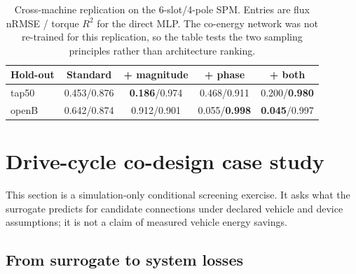 \documentclass[review]{elsarticle}
\begin{document}
\begin{table}[t]
\centering\small
\caption{Cross-machine replication on the 6-slot/4-pole SPM. Entries are
flux nRMSE / torque $R^2$ for the direct MLP. The co-energy network was not
re-trained for this replication, so the table tests the two sampling
principles rather than architecture ranking.}
\label{tab:machine2}
\begin{tabular}{lcccc}
\toprule
Hold-out & Standard & + magnitude & + phase & + both \\
\midrule
tap50 & 0.453/0.876 & \textbf{0.186}/0.974 & 0.468/0.911 & 0.200/\textbf{0.980} \\
openB & 0.642/0.874 & 0.912/0.901 & 0.055/\textbf{0.998} & \textbf{0.045}/0.997 \\
\bottomrule
\end{tabular}
\end{table}

\section{Drive-cycle co-design case study}
\label{sec:drive}

This section is a simulation-only conditional screening exercise. It asks
what the surrogate predicts for candidate connections under declared
vehicle and device assumptions; it is not a claim of measured vehicle
energy savings.

\subsection{From surrogate to system losses}
\end{document}

